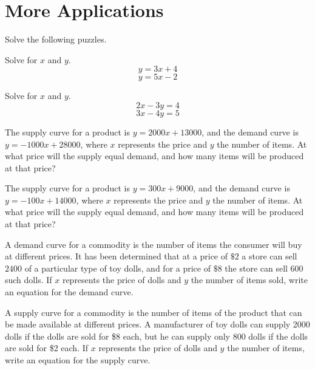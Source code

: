 \section{More Applications}

Solve the following puzzles.

\begin{puzzle}
    Solve for \( x \) and \( y \).
    \[ y = 3x + 4 \]
    \[ y = 5x - 2 \]

\end{puzzle}

\begin{puzzle}
    Solve for \( x \) and \( y \).
    \[ 2x - 3y = 4 \]
    \[ 3x - 4y = 5 \]

\end{puzzle}

\begin{puzzle}
    The supply curve for a product is \( y = 2000x + 13000 \), and the demand curve is \( y = -1000x + 28000 \), where \( x \) represents the price and \( y \) the number of items. At what price will the supply equal demand, and how many items will be produced at that price?

\end{puzzle}

\begin{puzzle}
    The supply curve for a product is \( y = 300x + 9000 \), and the demand curve is \( y = -100x + 14000 \), where \( x \) represents the price and \( y \) the number of items. At what price will the supply equal demand, and how many items will be produced at that price?

\end{puzzle}

\begin{puzzle}
    A demand curve for a commodity is the number of items the consumer will buy at different prices. It has been determined that at a price of \( \$2 \) a store can sell \( 2400 \) of a particular type of toy dolls, and for a price of \( \$8 \) the store can sell \( 600 \) such dolls. If \( x \) represents the price of dolls and \( y \) the number of items sold, write an equation for the demand curve.
\end{puzzle}


\begin{puzzle}
    A supply curve for a commodity is the number of items of the product that can be made available at different prices. A manufacturer of toy dolls can supply 2000 dolls if the dolls are sold for \$8 each, but he can supply only 800 dolls if the dolls are sold for \$2 each. If \( x \) represents the price of dolls and \( y \) the number of items, write an equation for the supply curve.

\end{puzzle}

